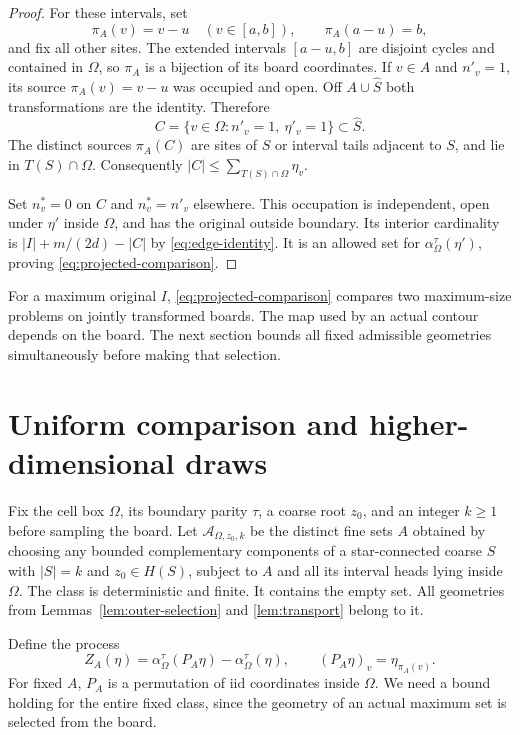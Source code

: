 \documentclass[11pt,a4paper]{article}
\numberwithin{equation}{section}
\begin{document}
\begin{proof}
For these intervals, set
\[
 \pi_A(v)=v-u\quad(v\in[a,b]),\qquad
 \pi_A(a-u)=b,
\]
and fix all other sites. The extended intervals $[a-u,b]$ are disjoint
cycles and contained in $\Omega$, so $\pi_A$ is a bijection of its board
coordinates. If $v\in A$ and $n'_v=1$, its source $\pi_A(v)=v-u$ was
occupied and open. Off $A\cup\widehat S$ both transformations are the
identity. Therefore
\[
 C=\{v\in\Omega:n'_v=1,\ \eta'_v=1\}\subset\widehat S.
\]
The distinct sources $\pi_A(C)$ are sites of $S$ or interval tails
adjacent to $S$, and lie in $T(S)\cap\Omega$. Consequently
$|C|\le\sum_{T(S)\cap\Omega}\eta_v$.

Set $n^*_v=0$ on $C$ and $n^*_v=n'_v$ elsewhere.
This occupation is independent, open under $\eta'$ inside $\Omega$,
and has the original outside boundary. Its interior cardinality is
$|I|+m/(2d)-|C|$ by \eqref{eq:edge-identity}.
It is an allowed set for $\alpha_\Omega^\tau(\eta')$, proving
\eqref{eq:projected-comparison}.
\end{proof}

For a maximum original $I$, \eqref{eq:projected-comparison} compares
two maximum-size problems on jointly transformed boards. The map used
by an actual contour depends on the board. The next section bounds all
fixed admissible geometries simultaneously before making that selection.


\section{Uniform comparison and higher-dimensional draws}
\label{sec:random}
Fix the cell box $\Omega$, its boundary parity $\tau$, a coarse root $z_0$,
and an integer $k\ge1$ before sampling the board.
Let $\mathcal A_{\Omega,z_0,k}$ be the distinct fine sets $A$ obtained
by choosing any bounded complementary components of a star-connected
coarse $S$ with $|S|=k$ and $z_0\in H(S)$, subject to
$A$ and all its interval heads lying inside $\Omega$.
The class is deterministic and finite. It contains the empty set.
All geometries from Lemmas~\ref{lem:outer-selection} and
\ref{lem:transport} belong to it.

Define the process
\[
 Z_A(\eta)=\alpha_\Omega^\tau(P_A\eta)-\alpha_\Omega^\tau(\eta),
 \qquad (P_A\eta)_v=\eta_{\pi_A(v)}.
\]
For fixed $A$, $P_A$ is a permutation of iid coordinates inside $\Omega$.
We need a bound holding for the entire fixed class, since the geometry
of an actual maximum set is selected from the board.
\end{document}
